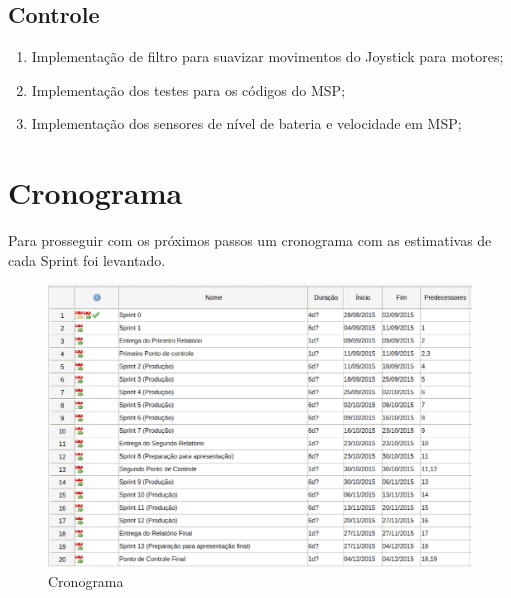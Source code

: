   \subsection{Controle}
    \begin{enumerate}
     \item Implementação de filtro para suavizar movimentos do Joystick para motores;
     \item Implementação dos testes para os códigos do MSP;
     \item Implementação dos sensores de nível de bateria e velocidade em MSP;
    \end{enumerate}

\section{Cronograma}

  Para prosseguir com os próximos passos um cronograma com as estimativas de cada Sprint foi levantado.

  \begin{figure}[!htb]
  \centering
    \includegraphics[keepaspectratio=true,scale=0.5]{figuras/metodologia/cronograma}
  \caption{Cronograma}
  \label{fig:cronograma}
  \end{figure}
